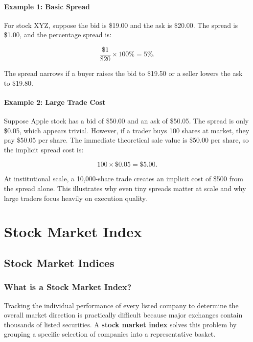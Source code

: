 \documentclass[12pt,openany]{book}
\begin{document}
\paragraph{Example 1: Basic Spread}
For stock XYZ, suppose the bid is \$19.00 and the ask is \$20.00. The spread is \$1.00, and the percentage spread is:

\begin{equation*}
    \frac{\$1}{\$20} \times 100\% = 5\%.
\end{equation*}

The spread narrows if a buyer raises the bid to \$19.50 or a seller lowers the ask to \$19.80.

\paragraph{Example 2: Large Trade Cost}
Suppose Apple stock has a bid of \$50.00 and an ask of \$50.05. The spread is only \$0.05, which appears trivial. However, if a trader buys 100 shares at market, they pay \$50.05 per share. The immediate theoretical sale value is \$50.00 per share, so the implicit spread cost is:

\begin{equation*}
    100 \times \$0.05 = \$5.00.
\end{equation*}

At institutional scale, a 10,000-share trade creates an implicit cost of \$500 from the spread alone. This illustrates why even tiny spreads matter at scale and why large traders focus heavily on execution quality.


\section{Stock Market Index}

\subsection{Stock Market Indices}

\subsubsection{What is a Stock Market Index?}
Tracking the individual performance of every listed company to determine the overall market direction is practically difficult because major exchanges contain thousands of listed securities. A \textbf{stock market index} solves this problem by grouping a specific selection of companies into a representative basket.
\end{document}
